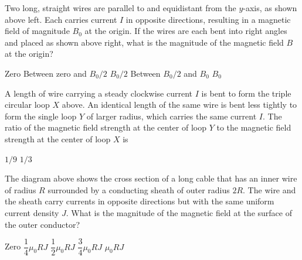 \documentclass[12pt]{../../../oss-classkick-exam}
\begin{document}
\begin{questions}
  \question Two long, straight wires are parallel to and equidistant from the
  $y$-axis, as shown above left. Each carries current $I$ in opposite
  directions, resulting in a magnetic field of magnitude $B_0$ at the origin.
  If the wires are each bent into right angles and placed as shown above right,
  what is the magnitude of the magnetic field $B$ at the origin?
  \begin{choices}
    \choice Zero
    \choice Between zero and $B_0/2$
    \choice $B_0/2$
    \choice Between $B_0/2$ and $B_0$
    \choice $B_0$
    \end{choices}


  \question A length of wire carrying a steady clockwise current $I$ is bent
  to form the triple circular loop $X$ above. An identical length of the same
  wire is bent less tightly to form the single loop $Y$ of larger radius, which
  carries the same current $I$. The ratio of the magnetic field strength at the
  center of loop $Y$ to the magnetic field strength at the center of loop $X$ is
  \begin{choices}
    \choice $1/9$
    \choice $1/3$
  \end{choices}
  \newpage
  
  \question The diagram above shows the cross section of a long cable that has
  an inner wire of radius $R$ surrounded by a conducting sheath of outer radius
  $2R$. The wire and the sheath carry currents in opposite directions but with
  the same uniform current density $J$. What is the magnitude of the magnetic
  field at the surface of the outer conductor?
  \begin{choices}
    \choice Zero
    \choice $\dfrac14\mu_0RJ$
    \choice $\dfrac12\mu_0RJ$
    \choice $\dfrac34\mu_0RJ$
    \choice $\mu_0RJ$
  \end{choices}


\end{questions}
\end{document}
